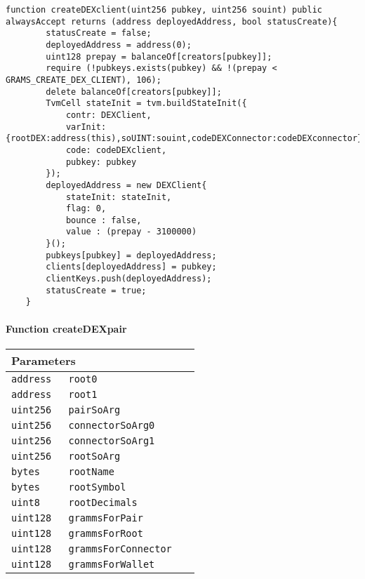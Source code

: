 \vspace{2cm}

\begin{lstlisting}[firstnumber=122]
	function createDEXclient(uint256 pubkey, uint256 souint) public alwaysAccept returns (address deployedAddress, bool statusCreate){
		statusCreate = false;
		deployedAddress = address(0);
		uint128 prepay = balanceOf[creators[pubkey]];
		require (!pubkeys.exists(pubkey) && !(prepay < GRAMS_CREATE_DEX_CLIENT), 106);
		delete balanceOf[creators[pubkey]];
		TvmCell stateInit = tvm.buildStateInit({
			contr: DEXClient,
			varInit: {rootDEX:address(this),soUINT:souint,codeDEXConnector:codeDEXconnector},
			code: codeDEXclient,
			pubkey: pubkey
		});
		deployedAddress = new DEXClient{
			stateInit: stateInit,
			flag: 0,
			bounce : false,
			value : (prepay - 3100000)
		}();
		pubkeys[pubkey] = deployedAddress;
		clients[deployedAddress] = pubkey;
		clientKeys.push(deployedAddress);
		statusCreate = true;
	}
\end{lstlisting}

\paragraph{Function createDEXpair}


\ifsoltables
\noindent\begin{tabular}{|l|l|p{5cm}|}\hline
\multicolumn{3}{|l|}{\bf Parameters}\\\hline
\tt address & \tt root0 &\\\hline
\tt address & \tt root1 &\\\hline
\tt uint256 & \tt pairSoArg &\\\hline
\tt uint256 & \tt connectorSoArg0 &\\\hline
\tt uint256 & \tt connectorSoArg1 &\\\hline
\tt uint256 & \tt rootSoArg &\\\hline
\tt bytes & \tt rootName &\\\hline
\tt bytes & \tt rootSymbol &\\\hline
\tt uint8 & \tt rootDecimals &\\\hline
\tt uint128 & \tt grammsForPair &\\\hline
\tt uint128 & \tt grammsForRoot &\\\hline
\tt uint128 & \tt grammsForConnector &\\\hline
\tt uint128 & \tt grammsForWallet &\\\hline
\end{tabular}
\fi


